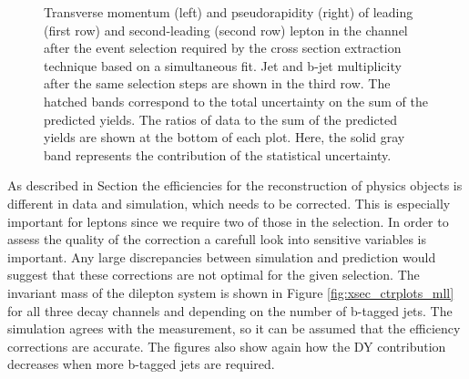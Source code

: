 \begin{figure}[htbp!]
\begin{center}
      \caption{Transverse momentum (left) and pseudorapidity (right)
        of leading (first row) and second-leading (second row) lepton in the \ee channel after the
        event selection required by the \ttbar cross section
        extraction technique based on a simultaneous fit. Jet and b-jet multiplicity after the same selection steps are
        shown in the third row. The hatched
        bands correspond to the total uncertainty on the sum of the
        predicted yields. 
        The ratios of data to the sum of the predicted yields are
        shown at the bottom of each plot. Here, the solid gray band
        represents the contribution of the statistical uncertainty.}  
       \label{fig:xsec_ee_ctrplots}
  \end{center}
\end{figure}

As described in Section  the efficiencies for the reconstruction of physics objects is different in data and simulation, which needs to be corrected.
This is especially important for leptons since we require two of those in the selection.
In order to assess the quality of the correction a carefull look into sensitive variables is important. Any large discrepancies between simulation and prediction would suggest that these corrections
are not optimal for the given selection.
The invariant mass of the dilepton system is shown in Figure \ref{fig:xsec_ctrplots_mll} for all three decay channels and depending on the number of b-tagged jets.
The simulation agrees with the measurement, so it can be assumed that the efficiency corrections are accurate.
The figures also show again how the DY contribution decreases when more b-tagged jets are required.


